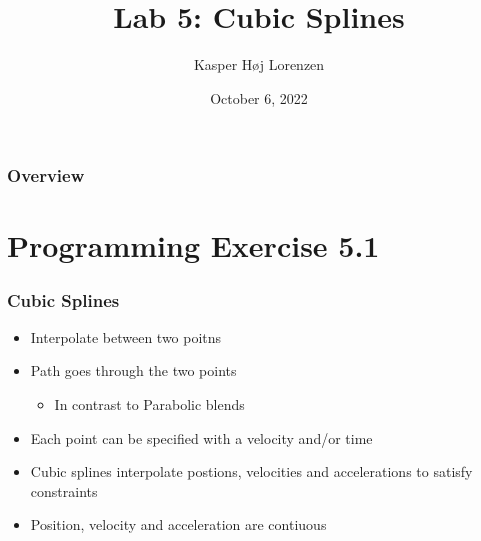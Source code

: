 \documentclass{beamer}
\title[Lab 5]{Lab 5: Cubic Splines} %
\author{Kasper Høj Lorenzen} %
\institute[SDU Robotics] %
{
Univeristy of Southern Denmark \\ %
\medskip
\textit{kalor@mmmi.sdu.dk} %
}
\date{October 6, 2022} %
\begin{document}
\begin{frame}
\titlepage %
\end{frame}

\begin{frame}
\frametitle{Overview} %
\tableofcontents %
\end{frame}



\section{Programming Exercise 5.1}


\begin{frame}
  \frametitle{Cubic Splines}
  \begin{itemize}
  \item Interpolate between two poitns
  \item Path goes through the two points
    \begin{itemize}
      \item In contrast to Parabolic blends
    \end{itemize}
  \item Each point can be specified with a velocity and/or time
  \item Cubic splines interpolate postions, velocities and accelerations to satisfy constraints
  \item Position, velocity and acceleration are contiuous
  \end{itemize}
\end{frame}
\end{document}

